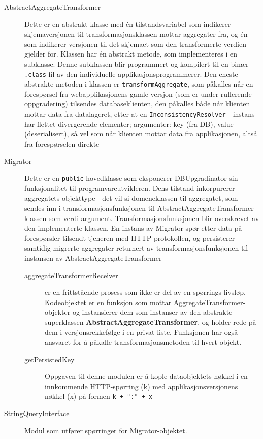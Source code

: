 \begin{description}
  \item [AbstractAggregateTransformer] Dette er en abstrakt klasse med én tilstandsvariabel som indikerer skjemaversjonen til transformasjonsklassen mottar aggregater fra, og én som indikerer versjonen til det skjemaet som den transformerte verdien gjelder for. Klassen har én abstrakt metode, som implementeres i en subklasse. Denne subklassen blir programmert og kompilert til en binær \texttt{.class}-fil av den individuelle applikasjonsprogrammerer. Den eneste abstrakte metoden i klassen er \texttt{transformAggregate}, som påkalles når en forespørsel fra webapplikasjonens gamle versjon (som er under rullerende oppgradering) tilsendes databaseklienten, den påkalles både når klienten mottar data fra datalageret, etter at en \texttt{InconsistencyResolver} - instans har flettet divergerende elementer; argumenter: key (fra DB), value (deserialisert), så vel som når klienten mottar data fra applikasjonen, altså fra forespørselen direkte
  \item [Migrator] Dette er en \texttt{public} hovedklasse som eksponerer DBUpgradinator sin funksjonalitet til programvareutvikleren. Dens tilstand inkorpurerer aggregatets objekttype - det vil si domeneklassen til aggregatet, som sendes inn i transformasjonsfunksjonen til AbstractAggregateTransformer-klassen som verdi-argument. Transformasjonsfunksjonen blir overskrevet av den implementerte klassen. En instans av Migrator spør etter data på forespørsler tilsendt tjeneren med HTTP-protokollen, og persisterer samtidig migrerte aggregater returnert av transformasjonsfunksjonen til instansen av AbstractAggregateTransformer
  \begin{description}
    \item [aggregateTransformerReceiver] er en frittstående prosess som ikke er del av en spørrings livsløp. Kodeobjektet er en funksjon som mottar AggregateTransformer-objekter og instansierer dem som instanser av den abstrakte superklassen \textbf{AbstractAggregateTransformer}. og holder rede på dem i versjonsrekkefølge i en privat liste. Funksjonen har også ansvaret for å påkalle transformasjonsmetoden til hvert objekt.
    \item [getPersistedKey] Oppgaven til denne modulen er å kople dataobjektets nøkkel i en innkommende HTTP-spørring (k) med applikasjonsversjonens nøkkel (x) på formen \texttt{k + ":" + x}
  \end{description}
  \item [StringQueryInterface] Modul som utfører spørringer for Migrator-objektet.
\end{description}

